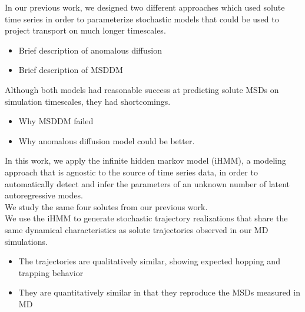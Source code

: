 \documentclass{article}
\begin{document}
  In our previous work, we designed two different approaches which used
  solute time series in order to parameterize stochastic models that could be used
  to project transport on much longer timescales.
  \begin{itemize}
  	\item Brief description of anomalous diffusion
  	\item Brief description of MSDDM
  \end{itemize}
  
  Although both models had reasonable success at predicting solute MSDs on simulation
  timescales, they had shortcomings.
  \begin{itemize}
  	\item Why MSDDM failed
  	\item Why anomalous diffusion model could be better.
  \end{itemize}
  
  In this work, we apply the infinite hidden markov model (iHMM), a modeling
  approach that is agnostic to the source of time series data, in order to 
  automatically detect and infer the parameters of an unknown number of latent
  autoregressive modes. \\
  
  We study the same four solutes from our previous work. \\
  
  We use the iHMM to generate stochastic trajectory realizations that share the same
  dynamical characteristics as solute trajectories observed in our MD simulations. 
  \begin{itemize}
    \item The trajectories are qualitatively similar, showing expected hopping and trapping
    behavior
    \item They are quantitatively similar in that they reproduce the MSDs measured in MD
  \end{itemize}

\end{document}
